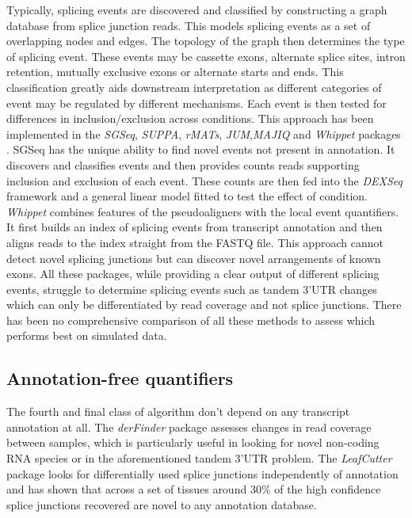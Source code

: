 Typically, splicing events are discovered and classified by constructing a graph database from splice junction reads.
This models splicing events as a set of overlapping nodes and edges. 
The topology of the graph then determines the type of splicing event.
These events may be cassette exons, alternate splice sites, intron retention, mutually exclusive exons or alternate starts and ends. 
This classification greatly aids downstream interpretation as different categories of event may be regulated by different mechanisms.
 Each event is then tested for differences in inclusion/exclusion across conditions. 
 This approach has been implemented in the \textit{SGSeq}, \textit{SUPPA}, \textit{rMATs}, \textit{JUM},\textit{MAJIQ} and \textit{Whippet} packages \citep{Goldstein2016,Alamancos2015,Vaquero-Garcia2016,Wang2018a,Shen2014, Sterne-Weiler2018a}. 
SGSeq has the unique ability to find novel events not present in annotation. 
It discovers and classifies events and then provides counts reads supporting inclusion and exclusion of each event.
These counts are then fed into the \textit{DEXSeq} framework and a general linear model fitted to test the effect of condition. %
\textit{Whippet} combines features of the pseudoaligners with the local event quantifiers. 
It first builds an index of splicing events from transcript annotation and then aligns reads to the index straight from the FASTQ file. 
This approach cannot detect novel splicing junctions but can discover novel arrangements of known exons.
All these packages, while providing a clear output of different splicing events, struggle to determine splicing events such as tandem 3'UTR changes which can only be differentiated by read coverage and not splice junctions.
There has been no comprehensive comparison of all these methods to assess which performs best on simulated data.

\subsection{Annotation-free quantifiers}
The fourth and final class of algorithm don't depend on any transcript annotation at all. The \textit{derFinder} package \citep{Collado-Torres2017} assesses changes in read coverage between samples, which is particularly useful in looking for novel non-coding RNA species or in the aforementioned tandem 3'UTR problem. The \textit{LeafCutter} package \citep{Li2016} looks for differentially used splice junctions independently of annotation and has shown that across a set of tissues around 30\% of the high confidence splice junctions recovered are novel to any annotation database. 

